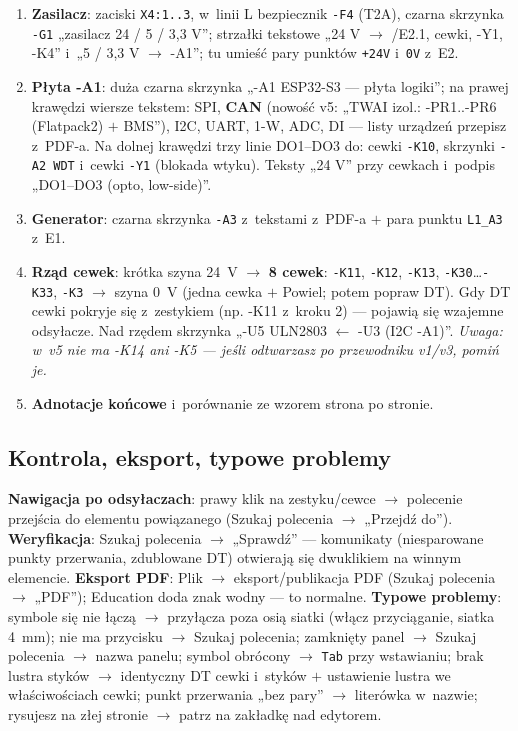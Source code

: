 \documentclass[11pt,a4paper]{article}
\begin{document}
\begin{enumerate}
zwierny \texttt{-K3} $\to$ skrzynka \texttt{-K2} z~tekstem I$>$ $\to$ Trójnik $\to$ dwa symbole
„silnik'' \texttt{-M3}/\texttt{-M4} $\to$ powrót \texttt{X4:N}; przerywana ramka z~podpisem.
\item \textbf{Zasilacz}: zaciski \texttt{X4:1..3}, w~linii L bezpiecznik \texttt{-F4} (T2A), czarna
skrzynka \texttt{-G1} „zasilacz 24 / 5 / 3,3 V''; strzałki tekstowe „24 V $\to$ /E2.1, cewki, -Y1, -K4''
i~„5 / 3,3 V $\to$ -A1''; tu umieść pary punktów \texttt{+24V} i~\texttt{0V} z~E2.
\item \textbf{Płyta -A1}: duża czarna skrzynka „-A1 ESP32-S3 --- płyta logiki''; na prawej krawędzi
wiersze tekstem: SPI, \textbf{CAN} (nowość v5: „TWAI izol.: -PR1..-PR6 (Flatpack2) $+$ BMS''), I2C,
UART, 1-W, ADC, DI --- listy urządzeń przepisz z~PDF-a. Na dolnej krawędzi trzy linie DO1--DO3 do:
cewki \texttt{-K10}, skrzynki \texttt{-A2 WDT} i~cewki \texttt{-Y1} (blokada wtyku). Teksty „24 V''
przy cewkach i~podpis „DO1--DO3 (opto, low-side)''.
\item \textbf{Generator}: czarna skrzynka \texttt{-A3} z~tekstami z~PDF-a $+$ para punktu
\texttt{L1\_A3} z~E1.
\item \textbf{Rząd cewek}: krótka szyna 24~V $\to$ \textbf{8 cewek}: \texttt{-K11}, \texttt{-K12},
\texttt{-K13}, \texttt{-K30}\ldots\texttt{-K33}, \texttt{-K3} $\to$ szyna 0~V (jedna cewka $+$ Powiel;
potem popraw DT). Gdy DT cewki pokryje się z~zestykiem (np. -K11 z~kroku 2) --- pojawią się wzajemne
odsyłacze. Nad rzędem skrzynka „-U5 ULN2803 $\leftarrow$ -U3 (I2C -A1)''. \emph{Uwaga: w~v5 nie ma
-K14 ani -K5 --- jeśli odtwarzasz po przewodniku v1/v3, pomiń je.}
\item \textbf{Adnotacje końcowe} i~porównanie ze wzorem strona po stronie.
\end{enumerate}

\subsection{Kontrola, eksport, typowe problemy}
\textbf{Nawigacja po odsyłaczach}: prawy klik na zestyku/cewce $\to$ polecenie przejścia do elementu
powiązanego (Szukaj polecenia $\to$ „Przejdź do''). \textbf{Weryfikacja}: Szukaj polecenia $\to$
„Sprawdź'' --- komunikaty (niesparowane punkty przerwania, zdublowane DT) otwierają się dwuklikiem na
winnym elemencie. \textbf{Eksport PDF}: Plik $\to$ eksport/publikacja PDF (Szukaj polecenia $\to$
„PDF''); Education doda znak wodny --- to normalne. \textbf{Typowe problemy}: symbole się nie łączą
$\to$ przyłącza poza osią siatki (włącz przyciąganie, siatka 4~mm); nie ma przycisku $\to$ Szukaj
polecenia; zamknięty panel $\to$ Szukaj polecenia $\to$ nazwa panelu; symbol obrócony $\to$ \texttt{Tab}
przy wstawianiu; brak lustra styków $\to$ identyczny DT cewki i~styków $+$ ustawienie lustra we
właściwościach cewki; punkt przerwania „bez pary'' $\to$ literówka w~nazwie; rysujesz na złej stronie
$\to$ patrz na zakładkę nad edytorem.
\end{document}
